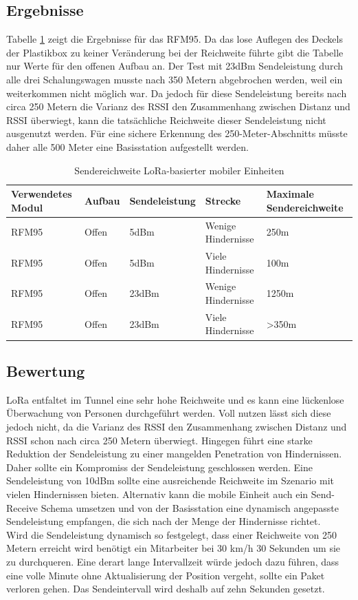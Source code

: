 \subsection{Ergebnisse}
Tabelle \ref{table:rangelora} zeigt die Ergebnisse für das RFM95.
Da das lose Auflegen des Deckels der Plastikbox zu keiner Veränderung bei der Reichweite führte gibt die Tabelle nur Werte für den offenen Aufbau an. 
Der Test mit 23dBm Sendeleistung durch alle drei Schalungswagen musste nach 350 Metern abgebrochen werden, weil ein weiterkommen nicht möglich war.
Da jedoch für diese Sendeleistung bereits nach circa 250 Metern die Varianz des RSSI den Zusammenhang zwischen Distanz und RSSI überwiegt, kann die tatsächliche Reichweite dieser Sendeleistung nicht ausgenutzt werden.
Für eine sichere Erkennung des 250-Meter-Abschnitts müsste daher alle 500 Meter eine Basisstation aufgestellt werden.

\begin{table}[h]
	\centering
	\caption{Sendereichweite LoRa-basierter mobiler Einheiten}
	\label{table:rangelora}
	\begin{tabular}{p{2.2cm}|p{1.5cm}|p{2.5cm}|p{3.5cm}|p{3cm}}
		Verwendetes Modul & Aufbau & Sendeleistung & Strecke & Maximale Sendereichweite \\
		\hline
		RFM95 & Offen & 5dBm & Wenige Hindernisse & 250m \\
		RFM95 & Offen & 5dBm & Viele Hindernisse & 100m \\
		\hline
		RFM95 & Offen & 23dBm & Wenige Hindernisse & 1250m \\
		RFM95 & Offen & 23dBm & Viele Hindernisse & >350m \\
	\end{tabular}
\end{table}

\subsection{Bewertung}
LoRa entfaltet im Tunnel eine sehr hohe Reichweite und es kann eine lückenlose Überwachung von Personen durchgeführt werden.
Voll nutzen lässt sich diese jedoch nicht, da die Varianz des RSSI den Zusammenhang zwischen Distanz und RSSI schon nach circa 250 Metern überwiegt. 
Hingegen führt eine starke Reduktion der Sendeleistung zu einer mangelden Penetration von Hindernissen.
Daher sollte ein Kompromiss der Sendeleistung geschlossen werden. 
Eine Sendeleistung von 10dBm sollte eine ausreichende Reichweite im Szenario mit vielen Hindernissen bieten.
Alternativ kann die mobile Einheit auch ein Send-Receive Schema umsetzen und von der Basisstation eine dynamisch angepasste Sendeleistung empfangen, die sich nach der Menge der Hindernisse richtet.\\
Wird die Sendeleistung dynamisch so festgelegt, dass einer Reichweite von 250 Metern erreicht wird benötigt ein Mitarbeiter bei 30 km/h 30 Sekunden um sie zu durchqueren.
Eine derart lange Intervallzeit würde jedoch dazu führen, dass eine volle Minute ohne Aktualisierung der Position vergeht, sollte ein Paket verloren gehen.
Das Sendeintervall wird deshalb auf zehn Sekunden gesetzt.

